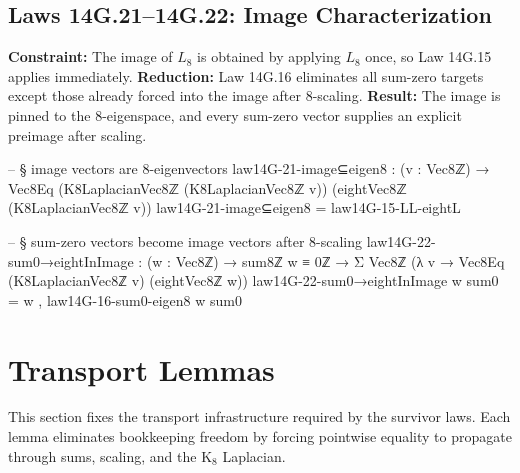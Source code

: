 \documentclass[11pt,a4paper]{book}
\begin{document}
\subsection{Laws 14G.21--14G.22: Image Characterization}

\textbf{Constraint:} The image of $L_8$ is obtained by applying $L_8$ once, so Law 14G.15 applies immediately.
\textbf{Reduction:} Law 14G.16 eliminates all sum-zero targets except those already forced into the image after $8$-scaling.
\textbf{Result:} The image is pinned to the $8$-eigenspace, and every sum-zero vector supplies an explicit preimage after scaling.

\begin{code}
-- § image vectors are 8-eigenvectors
law14G-21-image⊆eigen8 : (v : Vec8ℤ) → Vec8Eq (K8LaplacianVec8ℤ (K8LaplacianVec8ℤ v)) (eightVec8ℤ (K8LaplacianVec8ℤ v))
law14G-21-image⊆eigen8 = law14G-15-LL-eightL

-- § sum-zero vectors become image vectors after 8-scaling
law14G-22-sum0→eightInImage : (w : Vec8ℤ) → sum8ℤ w ≡ 0ℤ → Σ Vec8ℤ (λ v → Vec8Eq (K8LaplacianVec8ℤ v) (eightVec8ℤ w))
law14G-22-sum0→eightInImage w sum0 = w , law14G-16-sum0-eigen8 w sum0
\end{code}

\section{Transport Lemmas}

This section fixes the transport infrastructure required by the survivor laws.
Each lemma eliminates bookkeeping freedom by forcing pointwise equality to propagate through sums, scaling, and the K$_8$ Laplacian.
\end{document}
